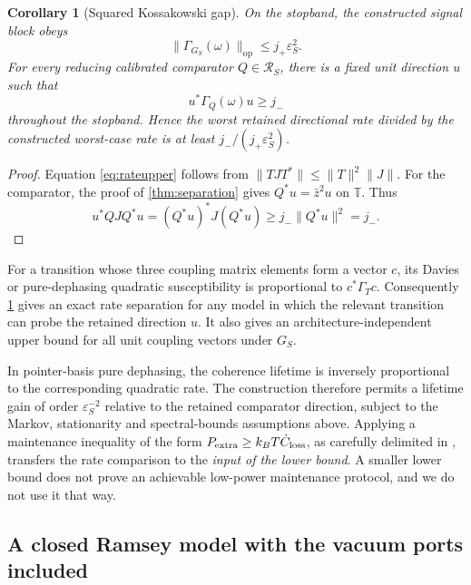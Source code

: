 \documentclass[11pt]{article}
\newtheorem{corollary}[theorem]{Corollary}
\theoremstyle{definition}
\theoremstyle{remark}
\newcommand{\T}{\mathbb{T}}
\newcommand{\cR}{\mathcal{R}}
\newcommand{\op}{\mathrm{op}}
\begin{document}
\begin{corollary}[Squared Kossakowski gap]\label{cor:rates}
On the stopband, the constructed signal block obeys
\begin{equation}\label{eq:rateupper}
 \|\Gamma_{G_S}(\omega)\|_{\op}
 \leq j_+\varepsilon_S^2.
\end{equation}
For every reducing calibrated comparator $Q\in\cR_S$, there is a fixed unit
direction $u$ such that
\begin{equation}\label{eq:ratelower}
 u^*\Gamma_Q(\omega)u\geq j_-
\end{equation}
throughout the stopband.  Hence the worst retained directional rate divided
by the constructed worst-case rate is at least
$j_-/(j_+\varepsilon_S^2)$.
\end{corollary}

\begin{proof}
Equation \eqref{eq:rateupper} follows from
$\|TJT^*\|\leq\|T\|^2\|J\|$.  For the comparator, the proof of
\cref{thm:separation} gives $Q^*u=\bar z^2u$ on $\T$.  Thus
\[
 u^*QJQ^*u=(Q^*u)^*J(Q^*u)\geq j_-\|Q^*u\|^2=j_-.
\]
\end{proof}

For a transition whose three coupling matrix elements form a vector $c$, its
Davies or pure-dephasing quadratic susceptibility is proportional to
$c^*\Gamma_Tc$.  Consequently \cref{cor:rates} gives an exact rate separation
for any model in which the relevant transition can probe the retained
direction $u$.  It also gives an architecture-independent upper bound for all
unit coupling vectors under $G_S$.

In pointer-basis pure dephasing, the coherence lifetime is inversely
proportional to the corresponding quadratic rate.  The construction therefore
permits a lifetime gain of order $\varepsilon_S^{-2}$ relative to the retained
comparator direction, subject to the Markov, stationarity and spectral-bounds
assumptions above.  Applying a maintenance inequality of the form
$P_{\rm extra}\geq k_BT\dot C_{\rm loss}$, as carefully delimited in
\cite{ErikssonCut2026}, transfers the rate comparison to the \emph{input of
the lower bound}.  A smaller lower bound does not prove an achievable low-power
maintenance protocol, and we do not use it that way.

\subsection{A closed Ramsey model with the vacuum ports included}
\end{document}

